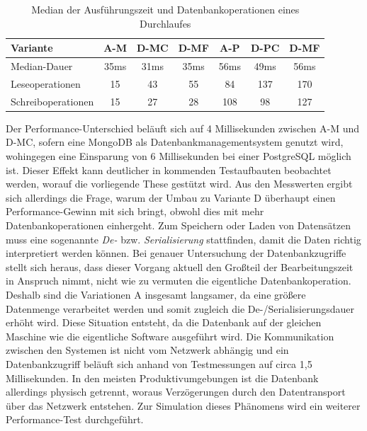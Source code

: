 \begin{table}[htpb!]
	\centering
	\begin{tabular}{ | >{\raggedright\arraybackslash}m{} || c | c | c | c | c | c | } 
		\hline
		\vspace{8pt}
		Variante \vspace{2pt} & A-M & D-MC & D-MF & A-P & D-PC & D-MF \\ 
		\hline
		\vspace{8pt}
		Median-Dauer \vspace{2pt} & 35ms & 31ms & 35ms & 56ms & 49ms & 56ms \\
		\hline
		\vspace{8pt}
		Leseoperationen \vspace{2pt} & 15 & 43 &  55 &  84 & 137 & 170 \\
		\hline
		\vspace{8pt}
		Schreiboperationen \vspace{2pt} & 15 & 27 & 28 & 108 & 98 & 127 \\
		\hline
	\end{tabular}
	\caption{Median der Ausführungszeit und Datenbankoperationen eines Durchlaufes}
	\label{fig:durationofexecution}
\end{table}

\pagebreak

Der Performance-Unterschied beläuft sich auf 4 Millisekunden zwischen A-M und D-MC, sofern eine MongoDB als Datenbankmanagementsystem genutzt wird, wohingegen eine Einsparung von 6 Millisekunden bei einer PostgreSQL möglich ist. Dieser Effekt kann deutlicher in kommenden Testaufbauten beobachtet werden, worauf die vorliegende These gestützt wird. Aus den Messwerten ergibt sich allerdings die Frage, warum der Umbau zu Variante D überhaupt einen Performance-Gewinn mit sich bringt, obwohl dies mit mehr Datenbankoperationen einhergeht. Zum Speichern oder Laden von Datensätzen muss eine sogenannte \emph{De-} bzw. \emph{\Gls{Serialisierung}} stattfinden, damit die Daten richtig interpretiert werden können. Bei genauer Untersuchung der Datenbankzugriffe stellt sich heraus, dass dieser Vorgang aktuell den Großteil der Bearbeitungszeit in Anspruch nimmt, nicht wie zu vermuten die eigentliche Datenbankoperation. Deshalb sind die Variationen A insgesamt langsamer, da eine größere Datenmenge verarbeitet werden und somit zugleich die De-/Serialisierungsdauer erhöht wird. Diese Situation entsteht, da die Datenbank auf der gleichen Maschine wie die eigentliche Software ausgeführt wird. Die Kommunikation zwischen den Systemen ist nicht vom Netzwerk abhängig und ein Datenbankzugriff beläuft sich anhand von Testmessungen auf circa 1,5 Millisekunden. In den meisten Produktivumgebungen ist die Datenbank allerdings physisch getrennt, woraus Verzögerungen durch den Datentransport über das Netzwerk entstehen. Zur Simulation dieses Phänomens wird ein weiterer Performance-Test durchgeführt. 

